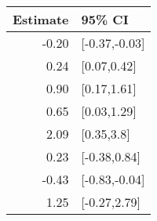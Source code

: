 \begin{tabular}{rl}
  \hline
Estimate & 95\% CI \\ 
  \hline
-0.20 & [-0.37,-0.03] \\ 
  0.24 & [0.07,0.42] \\ 
  0.90 & [0.17,1.61] \\ 
  0.65 & [0.03,1.29] \\ 
  2.09 & [0.35,3.8] \\ 
  0.23 & [-0.38,0.84] \\ 
  -0.43 & [-0.83,-0.04] \\ 
  1.25 & [-0.27,2.79] \\ 
   \hline
\end{tabular}

